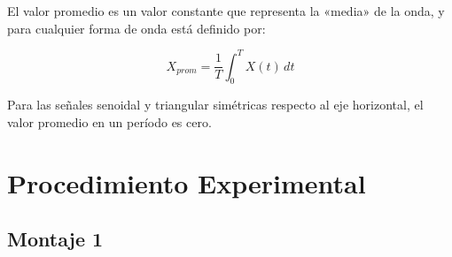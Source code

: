 \documentclass{article}
\begin{document}
    El valor promedio es un valor constante que representa la «media» de la onda, y para cualquier forma de onda está definido por:

    \[
        X_{prom} = \frac{1}{T}\int_{0}^{T} X(t)\,dt
    \]

    Para las señales senoidal y triangular simétricas respecto al eje horizontal, el valor promedio en un período es cero.

    \section{Procedimiento Experimental}

    \subsection{Montaje 1}
\end{document}
